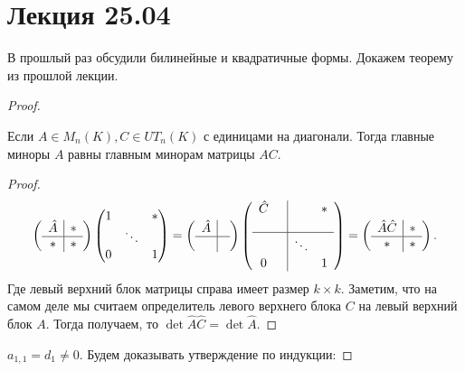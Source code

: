\section{Лекция 25.04}
\begin{motivation}
    В прошлый раз обсудили билинейные и квадратичные формы.
    Докажем теорему из прошлой лекции.
\end{motivation}
\begin{proof}
    \begin{lemma}
        Если $A\in M_n(K), C\in UT_n(K)$ с единицами на диагонали. Тогда главные миноры
        $A$ равны главным минорам матрицы $AC$.
    \end{lemma}
    \begin{proof}
        \[
        \left(\begin{array}{c|c}
                \hat{A} & * \\
                \hline
                 *& *
        \end{array}\right)
        \begin{pmatrix}
            1 & & *\\
              &\ddots&\\
            0 & & 1
        \end{pmatrix} =
        \left(\begin{array}{c|c}
                \hat{A} & \\
                \hline
                 & 
        \end{array}\right)
        \left(\begin{array}{cc|cc}
                \hat{C} & & &* \\
                & & & \\
                \hline
                &&\ddots&\\
                0&&&1
        \end{array}\right)=
        \left(\begin{array}{c|c}
                \hat{A} \hat{C} & * \\
                \hline
                 * & *
        \end{array}\right)
        .\] 
        Где левый верхний блок матрицы справа имеет размер $k\times k$.
        Заметим, что на самом деле мы считаем определитель левого верхнего блока $C$ на левый верхний блок $A$.
        Тогда получаем, то  $\det \hat{A} \hat{C} = \det \hat{A}$.
    \end{proof}
    $a_{1,1} = d_1 \neq 0$.
    Будем доказывать утверждение по индукции:

\end{proof}
